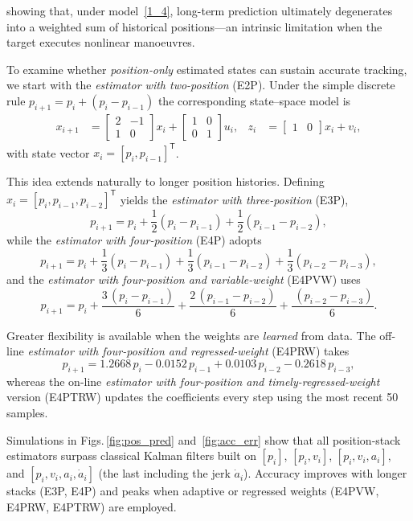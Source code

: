 \documentclass[sn-nature]{sn-jnl}%
\theoremstyle{thmstyleone}%
\theoremstyle{thmstyletwo}%
\theoremstyle{thmstylethree}%
\begin{document}
\noindent
showing that, under model~\eqref{1_4}, long-term prediction ultimately degenerates into a weighted sum of historical positions—an intrinsic limitation when the target executes nonlinear manoeuvres.


To examine whether \emph{position‐only} estimated states can sustain accurate tracking, we start with the \emph{estimator with two-position} (E2P).  Under the simple discrete rule
\(p_{i+1}=p_i+(p_i-p_{i-1})\) the corresponding state–space model is
\begin{equation}
\label{eq:E2P}
\begin{aligned}
x_{i+1} &=
\begin{bmatrix}
2 & -1\\
1 &  0
\end{bmatrix}x_i+
\begin{bmatrix}
1&0\\[2pt]
0&1
\end{bmatrix}u_i, &
z_i &=
\begin{bmatrix}
1&0
\end{bmatrix}x_i+v_i,
\end{aligned}
\end{equation}
with state vector \(x_i=[p_i,p_{i-1}]^{\mathsf T}\).

\medskip
This idea extends naturally to longer position histories.  Defining
\(x_i=[p_i,p_{i-1},p_{i-2}]^{\mathsf T}\) yields the \emph{estimator with three-position} (E3P),
\[
p_{i+1}=p_i+\frac12(p_i-p_{i-1})+\frac12(p_{i-1}-p_{i-2}),
\]
while the \emph{estimator with four-position} (E4P) adopts
\[
p_{i+1}=p_i+\frac13(p_i-p_{i-1})+\frac13(p_{i-1}-p_{i-2})
                     +\frac13(p_{i-2}-p_{i-3}),
\]
and the \emph{estimator with four-position and variable-weight} (E4PVW) uses
\[
p_{i+1}=p_i+\frac{3\,(p_i-p_{i-1})}{6}
                 +\frac{2\,(p_{i-1}-p_{i-2})}{6}
                 +\frac{\;(p_{i-2}-p_{i-3})}{6}.
\]

\medskip
Greater flexibility is available when the weights are \emph{learned} from data.
The off-line \emph{estimator with four-position and regressed-weight} (E4PRW) takes
\[
p_{i+1}=1.2668\,p_i
        -0.0152\,p_{i-1}
        +0.0103\,p_{i-2}
        -0.2618\,p_{i-3},
\]
whereas the on-line \emph{estimator with four-position and timely-regressed-weight} version (E4PTRW) updates the coefficients
every step using the most recent 50 samples.

\medskip
Simulations in Figs.\,\ref{fig:pos_pred} and~\ref{fig:acc_err} show that all
position-stack estimators surpass classical Kalman filters built on
\([p_i]\), \([p_i,v_i]\), \([p_i,v_i,a_i]\), and \([p_i,v_i,a_i,\dot a_i]\) (the last including the jerk
\(\dot a_i\)).  Accuracy improves with longer stacks (E3P, E4P) and peaks when
adaptive or regressed weights (E4PVW, E4PRW, E4PTRW) are employed.
\end{document}
